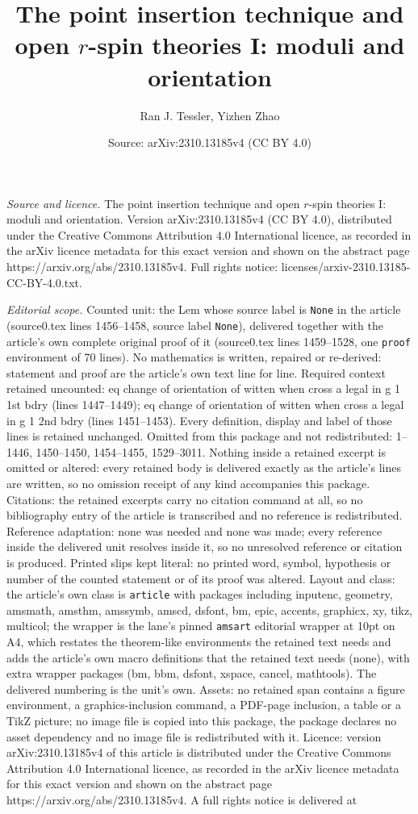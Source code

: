\documentclass[10pt,a4paper]{amsart}
\title[The point insertion technique and open $r$-spin theories I: ]{The point insertion technique and open $r$-spin theories I: moduli and orientation}
\author{Ran J. Tessler, Yizhen Zhao}
\date{Source: arXiv:2310.13185v4 (CC BY 4.0)}
\begin{document}
\maketitle

\noindent\emph{Source and licence.} The point insertion technique and open $r$-spin theories I: moduli and orientation. Version arXiv:2310.13185v4 (CC BY 4.0), distributed under the Creative Commons Attribution 4.0 International licence, as recorded in the arXiv licence metadata for this exact version and shown on the abstract page https://arxiv.org/abs/2310.13185v4. Full rights notice: licenses/arxiv-2310.13185-CC-BY-4.0.txt.\par\smallskip

\noindent\textit{Editorial scope.} Counted unit: the Lem whose source label is \texttt{None} in the article (source0.tex lines 1456--1458, source label \texttt{None}), delivered together with the article's own complete original proof of it (source0.tex lines 1459--1528, one \texttt{proof} environment of 70 lines). No mathematics is written, repaired or re-derived: statement and proof are the article's own text line for line. Required context retained uncounted: eq change of orientation of witten when cross a legal in g 1 1st bdry (lines 1447--1449); eq change of orientation of witten when cross a legal in g 1 2nd bdry (lines 1451--1453). Every definition, display and label of those lines is retained unchanged. Omitted from this package and not redistributed: 1--1446, 1450--1450, 1454--1455, 1529--3011. Nothing inside a retained excerpt is omitted or altered: every retained body is delivered exactly as the article's lines are written, so no omission receipt of any kind accompanies this package. Citations: the retained excerpts carry no citation command at all, so no bibliography entry of the article is transcribed and no reference is redistributed. Reference adaptation: none was needed and none was made; every reference inside the delivered unit resolves inside it, so no unresolved reference or citation is produced. Printed slips kept literal: no printed word, symbol, hypothesis or number of the counted statement or of its proof was altered. Layout and class: the article's own class is \texttt{article} with packages including inputenc, geometry, amsmath, amsthm, amssymb, amscd, dsfont, bm, epic, accents, graphicx, xy, tikz, multicol; the wrapper is the lane's pinned \texttt{amsart} editorial wrapper at 10pt on A4, which restates the theorem-like environments the retained text needs and adds the article's own macro definitions that the retained text needs (none), with extra wrapper packages (bm, bbm, dsfont, xspace, cancel, mathtools). The delivered numbering is the unit's own. Assets: no retained span contains a figure environment, a graphics-inclusion command, a PDF-page inclusion, a table or a TikZ picture; no image file is copied into this package, the package declares no asset dependency and no image file is redistributed with it. Licence: version arXiv:2310.13185v4 of this article is distributed under the Creative Commons Attribution 4.0 International licence, as recorded in the arXiv licence metadata for this exact version and shown on the abstract page https://arxiv.org/abs/2310.13185v4. A full rights notice is delivered at 
\end{document}

